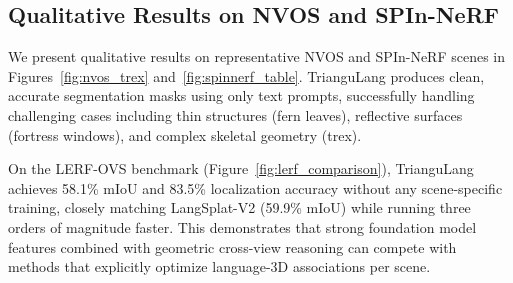 \begin{table}[h]
\centering
\caption{Comparison of mIoU and mAcc on ScanNet++ and uCo3D. All baselines use their respective SA-1B-trained weights. Prompt Projection$^\dagger$ unprojects prompts into 3D and re-projects per view to run SAM2 independently. SAM3 alone (no cross-view reasoning) underperforms MV-SAM, confirming that TrianguLang's gains come from GASA, not the backbone.}
\label{tab:benchmark_results}
\end{table}

\subsection{Qualitative Results on NVOS and SPIn-NeRF}

We present qualitative results on representative NVOS and SPIn-NeRF scenes in Figures~\cref{fig:nvos_trex} and~\cref{fig:spinnerf_table}. TrianguLang produces clean, accurate segmentation masks using only text prompts, successfully handling challenging cases including thin structures (fern leaves), reflective surfaces (fortress windows), and complex skeletal geometry (trex).

On the LERF-OVS benchmark (Figure~\ref{fig:lerf_comparison}), TrianguLang achieves 58.1\% mIoU and 83.5\% localization accuracy without any scene-specific training, closely matching LangSplat-V2 (59.9\% mIoU) while running three orders of magnitude faster. This demonstrates that strong foundation model features combined with geometric cross-view reasoning can compete with methods that explicitly optimize language-3D associations per scene.


